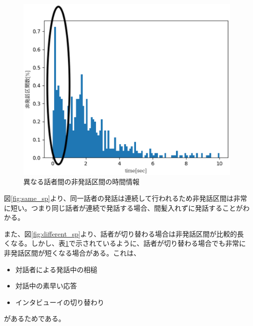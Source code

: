 \begin{figure}[H]
  \begin{center}
    \includegraphics{./figure/pre_other1.eps}
  \end{center}
  \caption{異なる話者間の非発話区間の時間情報 \label{fig:different_sp2}}
\end{figure}

図\ref{fig:same_sp}より、同一話者の発話は連続して行われるため非発話区間は非常に短い。つまり同じ話者が連続で発話する場合、間髪入れずに発話することがわかる。\par
また、図\ref{fig:different_sp}より、話者が切り替わる場合は非発話区間が比較的長くなる。しかし、表\ref{fig:different_sp2}で示されているように、話者が切り替わる場合でも非常に非発話区間が短くなる場合がある。これは、

\begin{itemize}
\item 対話者による発話中の相槌
\item 対話中の素早い応答
\item インタビューイの切り替わり
\end{itemize}

があるためである。
